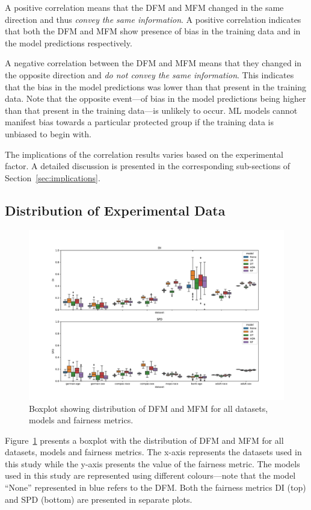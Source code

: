 \documentclass[conference,review,anonymous]{IEEEtran}
\begin{document}
A positive correlation means that the DFM and MFM changed in the same
direction and thus \emph{convey the same information}. A positive
correlation indicates that both the DFM and MFM show presence of bias
in the training data and in the model predictions respectively.

A negative correlation between the DFM and MFM means that they changed
in the opposite direction and \emph{do not convey the same
information}. This indicates that the bias in the model predictions
was lower than that present in the training data. Note that the
opposite event---of bias in the model predictions being higher than
that present in the training data---is unlikely to occur. ML models
cannot manifest bias towards a particular protected group if the
training data is unbiased to begin with.

The implications of the correlation results varies based on the
experimental factor. A detailed discussion is presented in the
corresponding sub-sections of Section \ref{sec:implications}.

\subsection{Distribution of Experimental Data}\label{sec:data-analysis}

\begin{figure}
  \centering
  \includegraphics[width=\linewidth]{boxplot--dataset--di-spd--exp-full.pdf}
  \caption{Boxplot showing distribution of DFM and MFM for all
    datasets, models and fairness metrics.}
  \label{fig:boxplot--dataset--di-spd--exp-full}
\end{figure}

Figure \ref{fig:boxplot--dataset--di-spd--exp-full} presents a boxplot
with the distribution of DFM and MFM for all datasets, models and
fairness metrics. The x-axis represents the datasets used in this
study while the y-axis presents the value of the fairness metric. The
models used in this study are represented using different
colours---note that the model ``None'' represented in blue refers to
the DFM. Both the fairness metrics DI (top) and SPD (bottom) are
presented in separate plots.
\end{document}
